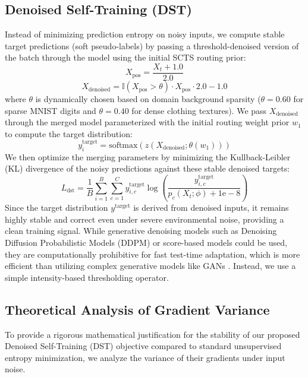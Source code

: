 \documentclass{article}
\theoremstyle{plain}
\theoremstyle{definition}
\theoremstyle{remark}
\begin{document}
\subsection{Denoised Self-Training (DST)}
Instead of minimizing prediction entropy on noisy inputs, we compute stable target predictions (soft pseudo-labels) by passing a threshold-denoised version of the batch through the model using the initial SCTS routing prior:
\begin{equation}
    X_{\text{pos}} = \frac{X_t + 1.0}{2.0}
\end{equation}
\begin{equation}
    X_{\text{denoised}} = \mathbb{I}(X_{\text{pos}} > \theta) \cdot X_{\text{pos}} \cdot 2.0 - 1.0
\end{equation}
where $\theta$ is dynamically chosen based on domain background sparsity ($\theta = 0.60$ for sparse MNIST digits and $\theta = 0.40$ for dense clothing textures). We pass $X_{\text{denoised}}$ through the merged model parameterized with the initial routing weight prior $w_1$ to compute the target distribution:
\begin{equation}
    y^{\text{target}}_i = \text{softmax}(z(X_{\text{denoised}}; \theta(w_1)))
\end{equation}
We then optimize the merging parameters by minimizing the Kullback-Leibler (KL) divergence of the noisy predictions against these stable denoised targets:
\begin{equation}
    L_{\text{dst}} = \frac{1}{B} \sum_{i=1}^B \sum_{c=1}^C y^{\text{target}}_{i,c} \log \left( \frac{y^{\text{target}}_{i,c}}{p_c(X_t; \phi) + 1\text{e}-8} \right)
\end{equation}
Since the target distribution $y^{\text{target}}$ is derived from denoised inputs, it remains highly stable and correct even under severe environmental noise, providing a clean training signal. While generative denoising models such as Denoising Diffusion Probabilistic Models (DDPM) \cite{ho2020denoising} or score-based models \cite{song2020score} could be used, they are computationally prohibitive for fast test-time adaptation, which is more efficient than utilizing complex generative models like GANs \cite{goodfellow2014generative}. Instead, we use a simple intensity-based thresholding operator.

\subsection{Theoretical Analysis of Gradient Variance}
To provide a rigorous mathematical justification for the stability of our proposed Denoised Self-Training (DST) objective compared to standard unsupervised entropy minimization, we analyze the variance of their gradients under input noise.
\end{document}
